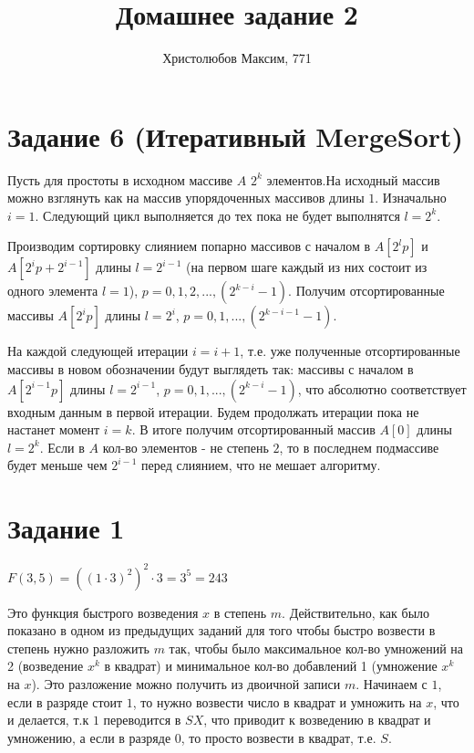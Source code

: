 \documentclass[a4paper,12pt]{article}
\author{Христолюбов Максим, 771}
\title{Домашнее задание 2}
\date{ }
\begin{document}

\maketitle

\section*{Задание 6 (Итеративный MergeSort)}  
\hspace{0.5cm}
Пусть для простоты в исходном массиве $A$ $2^k$ элементов.На исходный массив можно взглянуть как на массив упорядоченных массивов длины $1$. Изначально $i=1$. Следующий цикл выполняется до тех пока не будет выполнятся $l=2^k$.

Производим сортировку слиянием попарно массивов с началом в $A[2^{l}p]$ и $A[2^{i}p+2^{i-1}]$ длины $l=2^{i-1}$ (на первом шаге каждый из них состоит из одного элемента $l=1$), $p=0,1,2,...,(2^{k-i}-1)$. Получим отсортированные массивы $A[2^{i}p]$ длины $l=2^i$, $p=0,1,...,(2^{k-i-1}-1)$.

На каждой следующей итерации $i=i+1$, т.е. уже полученные отсортированные массивы в новом обозначении будут выглядеть так: массивы с началом в $A[2^{i-1}p]$ длины $l=2^{i-1}$, $p=0,1,...,(2^{k-i}-1)$, что абсолютно соответствует входным данным в первой итерации. Будем продолжать итерации пока не настанет момент $i=k$. В итоге получим отсортированный массив $A[0]$ длины $l=2^k$. Если в $A$ кол-во элементов - не степень $2$, то в последнем подмассиве будет меньше чем $2^{i-1}$ перед слиянием, что не мешает алгоритму.

\section*{Задание 1}
\hspace{0.5cm}
$F(3,5)=\left( (1\cdot3)^2\right) ^2\cdot 3 = 3^5=243$


Это функция быстрого возведения $x$ в степень $m$. Действительно, как было показано в одном из предыдущих заданий для того чтобы быстро возвести в степень нужно разложить $m$ так, чтобы было максимальное кол-во умножений на 2 (возведение $x^k$ в квадрат) и минимальное кол-во добавлений 1 (умножение $x^k$ на $x$). Это разложение можно получить из двоичной записи $m$. Начинаем с $1$, если в разряде стоит $1$, то нужно возвести число в квадрат и умножить на $x$, что и делается, т.к $1$ переводится в $SX$, что приводит к возведению в квадрат и умножению, а если в разряде $0$, то просто возвести в квадрат, т.е.  $S$.
\end{document}
